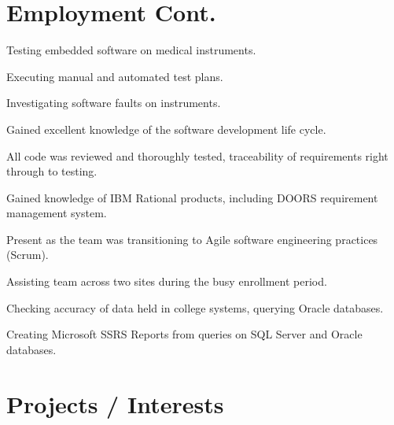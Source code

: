 \documentclass[a4paper]{deedy-resume} %
\begin{document}
\begin{minipage}[t]{0.66\textwidth} %

\section{Employment Cont.}


\vspace{\topsep}
\begin{tightitemize}
\item Testing embedded software on medical instruments.
\item Executing manual and automated test plans.
\item Investigating software faults on instruments.
\item Gained excellent knowledge of the software development life cycle.
\item All code was reviewed and thoroughly tested, traceability of requirements right through to testing.
\item Gained knowledge of IBM Rational products, including DOORS requirement management system.
\item Present as the team was transitioning to Agile software engineering practices (Scrum).
\end{tightitemize}

\sectionspace %


\begin{tightitemize}
\item Assisting team across two sites during the busy enrollment period.
\item Checking accuracy of data held in college systems, querying Oracle databases.
\item Creating Microsoft SSRS Reports from queries on SQL Server and Oracle databases.
\end{tightitemize}
\sectionspace %


\section{Projects / Interests}


\end{minipage}
\end{document}
